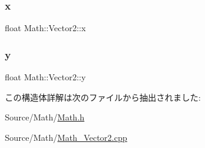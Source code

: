 \subsubsection{\texorpdfstring{x}{x}}
{\footnotesize\ttfamily float Math\+::\+Vector2\+::x}

\mbox{\label{struct_math_1_1_vector2_ad6454a7c7a58d8814e2ec7b78743c63c}} 
\subsubsection{\texorpdfstring{y}{y}}
{\footnotesize\ttfamily float Math\+::\+Vector2\+::y}



この構造体詳解は次のファイルから抽出されました\+:\begin{DoxyCompactItemize}
\item 
Source/\+Math/\mbox{\hyperlink{_math_8h}{Math.\+h}}\item 
Source/\+Math/\mbox{\hyperlink{_math___vector2_8cpp}{Math\+\_\+\+Vector2.\+cpp}}\end{DoxyCompactItemize}
